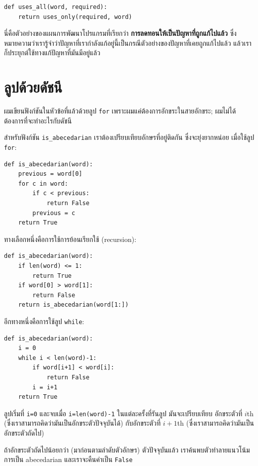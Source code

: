 \begin{verbatim}
def uses_all(word, required):
    return uses_only(required, word)
\end{verbatim}
%
นี่คือตัวอย่างของแผนการพัฒนาโปรแกรมที่เรียกว่า {\bf การลดทอนให้เป็นปัญหาที่ถูกแก้ไปแล้ว}
ซึ่งหมายความว่าเรารู้จำว่าปัญหาที่เรากำลังแก้อยู่นี้เป็นกรณีตัวอย่างของปัญหาที่เคยถูกแก้ไปแล้ว
แล้วเราก็ประยุกต์ใช้ทางแก้ปัญหาที่มันมีอยู่แล้ว



\section{ลูปด้วยดัชนี} %

ผมเขียนฟังก์ชันในหัวข้อที่แล้วด้วยลูป {\tt for} เพราะผมแค่ต้องการอักขระในสายอักขระ;
ผมไม่ได้ต้องการที่จะทำอะไรกับดัชนี

สำหรับฟังก์ชัน \verb"is_abecedarian" เราต้องเปรียบเทียบอักษรที่อยู่ติดกัน ซึ่งจะยุ่งยากหน่อย
เมื่อใช้ลูป {\tt for}:

\begin{verbatim}
def is_abecedarian(word):
    previous = word[0]
    for c in word:
        if c < previous:
            return False
        previous = c
    return True
\end{verbatim}

ทางเลือกหนึ่งคือการใช้การย้อนเรียกใช้ (recursion):

\begin{verbatim}
def is_abecedarian(word):
    if len(word) <= 1:
        return True
    if word[0] > word[1]:
        return False
    return is_abecedarian(word[1:])
\end{verbatim}

อีกทางหนึ่งคือการใช้ลูป {\tt while}:

\begin{verbatim}
def is_abecedarian(word):
    i = 0
    while i < len(word)-1:
        if word[i+1] < word[i]:
            return False
        i = i+1
    return True
\end{verbatim}
%
ลูปเริ่มที่ {\tt i=0} และจบเมื่อ {\tt i=len(word)-1} ในแต่ละครั้งที่รันลูป มันจะเปรียบเทียบ
อักขระตัวที่ {\scriptsize$i$}th (ซึ่งเราสามารถคิดว่ามันเป็นอักขระตัวปัจจุบันได้) กับอักขระตัวที่ {\scriptsize$i+1$}th
(ซึ่งเราสามารถคิดว่ามันเป็นอักขระตัวถัดไป)

ถ้าอักขระตัวถัดไปน้อยกว่า (มาก่อนตามลำดับตัวอักษร) ตัวปัจจุบันแล้ว 
เราค้นพบตัวทำลายแนวโน้มการเป็น abecedarian และเราจะคืนค่าเป็น {\tt False}

